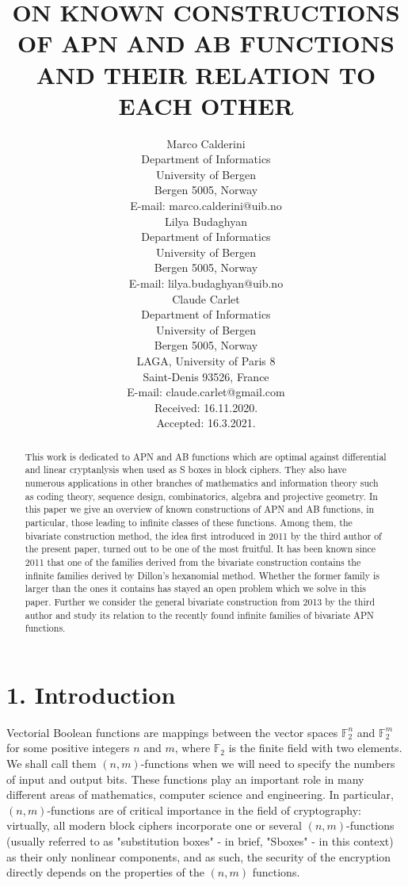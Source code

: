 \documentclass[10pt]{article}
\title{ON KNOWN CONSTRUCTIONS OF APN AND AB FUNCTIONS AND THEIR RELATION TO EACH OTHER }
\author{Marco Calderini\\
Department of Informatics\\
University of Bergen\\
Bergen 5005, Norway\\
E-mail: marco.calderini@uib.no\\
Lilya Budaghyan\\
Department of Informatics\\
University of Bergen\\
Bergen 5005, Norway\\
E-mail: lilya.budaghyan@uib.no\\
Claude Carlet\\
Department of Informatics\\
University of Bergen\\
Bergen 5005, Norway\\
LAGA, University of Paris 8\\
Saint-Denis 93526, France\\
E-mail: claude.carlet@gmail.com\\
Received: 16.11.2020.\\
Accepted: 16.3.2021.}
\date{}
\begin{document}
\maketitle
\captionsetup{singlelinecheck=false}


\begin{abstract}
This work is dedicated to APN and AB functions which are optimal against differential and linear cryptanlysis when used as S boxes in block ciphers. They also have numerous applications in other branches of mathematics and information theory such as coding theory, sequence design, combinatorics, algebra and projective geometry. In this paper we give an overview of known constructions of APN and AB functions, in particular, those leading to infinite classes of these functions. Among them, the bivariate construction method, the idea first introduced in 2011 by the third author of the present paper, turned out to be one of the most fruitful. It has been known since 2011 that one of the families derived from the bivariate construction contains the infinite families derived by Dillon's hexanomial method. Whether the former family is larger than the ones it contains has stayed an open problem which we solve in this paper. Further we consider the general bivariate construction from 2013 by the third author and study its relation to the recently found infinite families of bivariate APN functions.
\end{abstract}

\section*{1. Introduction}
Vectorial Boolean functions are mappings between the vector spaces $\mathbb{F}_{2}^{n}$ and $\mathbb{F}_{2}^{m}$ for some positive integers $n$ and $m$, where $\mathbb{F}_{2}$ is the finite field with two elements. We shall call them $(n, m)$-functions when we will need to specify the numbers of input and output bits. These functions play an important role in many different areas of mathematics, computer science and engineering. In particular, $(n, m)$-functions are of critical importance in the field of cryptography: virtually, all modern block ciphers incorporate one or several $(n, m)$-functions (usually referred to as "substitution boxes" - in brief, "Sboxes" - in this context) as their only nonlinear components, and as such, the security of the encryption directly depends on the properties of the $(n, m)$ functions.
\end{document}
